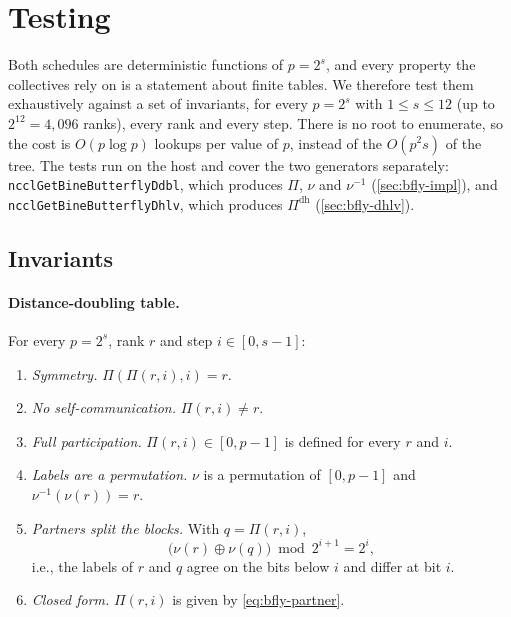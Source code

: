 \section{Testing}\label{sec:bfly-testing}

Both schedules are deterministic functions of $p=2^s$, and every property the collectives rely on is a statement about finite tables.
We therefore test them exhaustively against a set of invariants, for every $p=2^s$ with $1\le s\le 12$ (up to $2^{12}=4{,}096$ ranks), every rank and every step.
There is no root to enumerate, so the cost is $O(p\log p)$ lookups per value of $p$, instead of the $O(p^2 s)$ of the tree.
The tests run on the host and cover the two generators separately: \texttt{ncclGetBineButterflyDdbl}, which produces $\Pi$, $\nu$ and $\nu^{-1}$ (\cref{sec:bfly-impl}), and \texttt{ncclGetBineButterflyDhlv}, which produces $\Pi^{\mathrm{dh}}$ (\cref{sec:bfly-dhlv}).

\subsection{Invariants}

\paragraph{Distance-doubling table.}
For every $p=2^s$, rank $r$ and step $i\in[0,s-1]$:
\begingroup
\renewcommand{\theenumi}{J\arabic{enumi}}
\renewcommand{\labelenumi}{\textbf{(\theenumi)}}
\begin{enumerate}
  \item \label{inv:bfly-sym} \emph{Symmetry.} $\Pi(\Pi(r,i),i)=r$.
  \item \label{inv:bfly-self} \emph{No self-communication.} $\Pi(r,i)\neq r$.
  \item \label{inv:bfly-full} \emph{Full participation.} $\Pi(r,i)\in[0,p-1]$ is defined for every $r$ and $i$.
  \item \label{inv:bfly-perm} \emph{Labels are a permutation.} $\nu$ is a permutation of $[0,p-1]$ and $\nu^{-1}(\nu(r))=r$.
  \item \label{inv:bfly-split} \emph{Partners split the blocks.} With $q=\Pi(r,i)$,
  \begin{equation}
    \bigl(\nu(r)\oplus\nu(q)\bigr)\bmod 2^{i+1}=2^i,
    \label{eq:bfly-split}
  \end{equation}
  i.e., the labels of $r$ and $q$ agree on the bits below $i$ and differ at bit $i$.
  \item \label{inv:bfly-closed} \emph{Closed form.} $\Pi(r,i)$ is given by \cref{eq:bfly-partner}.
\end{enumerate}
\endgroup

